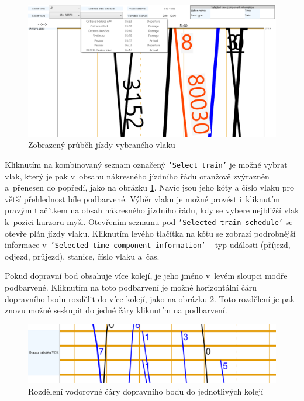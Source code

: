 \begin{figure}[!hbt]
	\centering
	\includegraphics[width=\textwidth]{../img/kap6_static_schedule_train_selection}
	\caption{Zobrazený průběh jízdy vybraného vlaku}
	\label{fig:kap6:static_schedule_train_selection}
\end{figure}

Kliknutím na kombinovaný seznam označený \texttt{'Select train'} je možné vybrat vlak, který je pak v~obsahu nákresného jízdního řádu oranžově zvýrazněn a~přenesen do popředí, jako na obrázku \ref{fig:kap6:static_schedule_train_selection}. Navíc jsou jeho kóty a číslo vlaku pro větší přehlednost bíle podbarvené. Výběr vlaku je možné provést i~kliknutím pravým tlačítkem na obsah nákresného jízdního řádu, kdy se vybere nejbližší vlak k~pozici kurzoru myši. Otevřením seznamu pod \texttt{'Selected train schedule'} se otevře plán jízdy vlaku. Kliknutím levého tlačítka na kótu se zobrazí podrobnější informace v~\texttt{'Selected time component information'} -- typ události (příjezd, odjezd, průjezd), stanice, číslo vlaku a~čas.

Pokud dopravní bod obsahuje více kolejí, je jeho jméno v~levém sloupci modře podbarvené. Kliknutím na toto podbarvení je možné horizontální čáru dopravního bodu rozdělit do více kolejí, jako na obrázku \ref{fig:kap6:szdc_toggle_stations}. Toto rozdělení je pak znovu možné seskupit do jedné čáry kliknutím na podbarvení.

\begin{figure}[!hbt]
	\centering
	\includegraphics[width=\textwidth]{../img/kap6_szdc_toggle_stations}
	\caption{Rozdělení vodorovné čáry dopravního bodu do jednotlivých kolejí}
	\label{fig:kap6:szdc_toggle_stations}
\end{figure}

